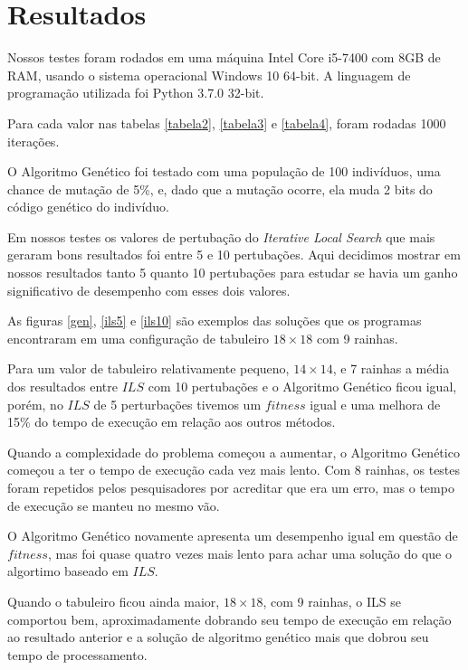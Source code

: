 \documentclass[
	article,			%
	11pt,				%
	oneside,			%
	a4paper,			%
	english,			%
	brazil,				%
	sumario=tradicional
	]{abntex2}
\begin{document}
\section{Resultados}

Nossos testes foram rodados em uma máquina Intel Core i5-7400 com 8GB de RAM, usando o sistema operacional Windows 10 64-bit. A linguagem de programação utilizada foi Python 3.7.0 32-bit.

Para cada valor nas tabelas \ref{tabela2}, \ref{tabela3} e \ref{tabela4}, foram rodadas 1000 iterações.

O Algoritmo Genético foi testado com uma população de 100 indivíduos, uma chance de mutação de 5\%, e, dado que a mutação ocorre, ela muda 2 bits do código genético do indivíduo.

Em nossos testes os valores de pertubação do \textit{Iterative Local Search} que mais geraram bons resultados foi entre 5 e 10 pertubações. Aqui decidimos mostrar em nossos resultados tanto 5 quanto 10 pertubações para estudar se havia um ganho significativo de desempenho com esses dois valores.

As figuras \ref{gen}, \ref{ils5} e \ref{ils10} são exemplos das soluções que os programas encontraram em uma configuração de tabuleiro $18 \times 18$ com 9 rainhas.

Para um valor de tabuleiro relativamente pequeno, $14 \times 14$, e 7 rainhas a média dos resultados entre $ILS$ com 10 pertubações e o Algoritmo Genético ficou igual, porém, no $ILS$ de 5 perturbações tivemos um $fitness$ igual e uma melhora de 15\% do tempo de execução em relação aos outros métodos. 

Quando a complexidade do problema começou a aumentar, o Algoritmo Genético começou a ter o tempo de execução cada vez mais lento. Com 8 rainhas, os testes foram repetidos pelos pesquisadores por acreditar que era um erro, mas o tempo de execução se manteu no mesmo vão.

O Algoritmo Genético novamente apresenta um desempenho igual em questão de $fitness$, mas foi quase quatro vezes mais lento para achar uma solução do que o algortimo baseado em $ILS$.

Quando o tabuleiro ficou ainda maior, $18 \times 18$, com 9 rainhas, o ILS se comportou bem, aproximadamente dobrando seu tempo de execução em relação ao resultado anterior e a solução de algoritmo genético mais que dobrou seu tempo de processamento.
\end{document}
